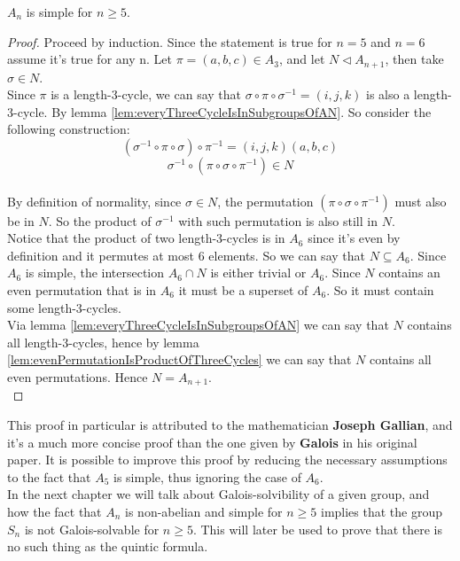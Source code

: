 \begin{theorem}[Simplicity of $A_n$]
    $A_n$ is simple for $n \geq 5$.
\end{theorem}
\begin{proof}
    Proceed by induction. Since the statement is true for $n = 5$ and $n = 6$ assume it's true for 
    any n. Let $\pi = (a,b,c) \in A_3$, and let $N \triangleleft A_{n+1}$, then take 
    $\sigma \in N$.\\

    Since $\pi$ is a length-3-cycle, we can say that $\sigma \circ \pi \circ \sigma^{-1} = (i,j,k)$
    is also a length-3-cycle. By lemma \ref{lem:everyThreeCycleIsInSubgroupsOfAN}. So consider the 
    following construction:\\

    $$ (\sigma^{-1} \circ \pi \circ \sigma) \circ \pi^{-1} = (i,j,k)(a,b,c) $$
    $$ \sigma^{-1} \circ (\pi \circ \sigma \circ \pi^{-1}) \in N $$ \\

    By definition of normality, since $\sigma \in N$, the permutation $(\pi \circ \sigma \circ \pi^{-1})$ 
    must also be in $N$. So the product of $\sigma^{-1}$ with such permutation is also still in $N$. \\

    Notice that the product of two length-3-cycles is in $A_6$ since it's even by definition and 
    it permutes at most 6 elements. So we can say that $N \subseteq A_6$. Since $A_6$ is simple,
    the intersection $A_6 \cap N$ is either trivial or $A_6$. Since $N$ contains an even permutation
    that is in $A_6$ it must be a superset of $A_6$. So it must contain some length-3-cycles. \\

    Via lemma \ref{lem:everyThreeCycleIsInSubgroupsOfAN} we can say that $N$ contains all
    length-3-cycles, hence by lemma \ref{lem:evenPermutationIsProductOfThreeCycles} we can say 
    that $N$ contains all even permutations. Hence $N = A_{n+1}$. \\
\end{proof} \vspace{0.2em}
    
This proof in particular is attributed to the mathematician \textbf{Joseph Gallian}, and it's a much 
more concise proof than the one given by \textbf{Galois} in his original paper. It is possible 
to improve this proof by reducing the necessary assumptions to the fact that $A_5$ is simple, thus 
ignoring the case of $A_6$. \\

In the next chapter we will talk about Galois-solvibility of a given group, and how the fact that 
$A_n$ is non-abelian and simple for $n \geq 5$ implies that the group $S_n$ is not 
Galois-solvable for $n \geq 5$. This will later be used to prove that there is no such thing 
as the quintic formula. \\

\newpage
